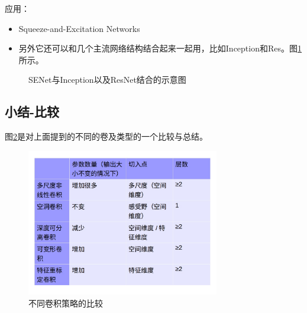 应用：
\begin{itemize}
\item Squeeze-and-Excitation Networks
\item 另外它还可以和几个主流网络结构结合起来一起用，比如Inception和Res。图\ref{SENetConv1}所示。
\end{itemize}

\begin{figure}[!htbp]
\centering
{}
\:
\caption{SENet与Inception以及ResNet结合的示意图}
\label{SENetConv1}
\end{figure}

\subsection{小结-比较}

图\ref{Conv0}是对上面提到的不同的卷及类型的一个比较与总结。

\begin{figure}
\centering
\includegraphics[width=0.75\textwidth]{DLTips/Conv0.jpg}
\caption{不同卷积策略的比较}
\label{Conv0}
\end{figure}

